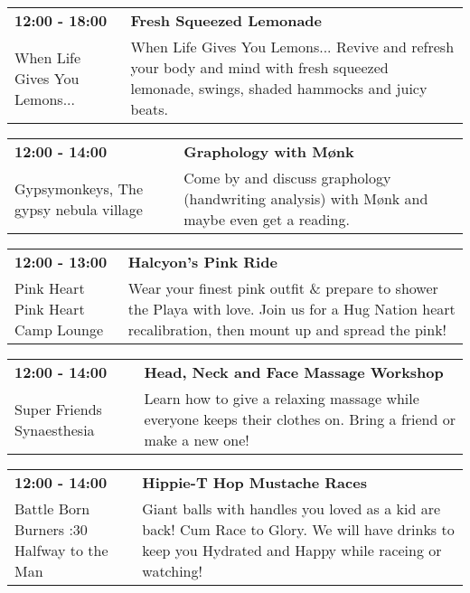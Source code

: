 \begin{tabular}{ p{1in} p{2.2in} }
    \textbf{12:00 - 18:00} & \textbf{Fresh Squeezed Lemonade} \\
    When Life Gives You Lemons... \newline  & When Life Gives You Lemons... Revive and refresh your body and mind with fresh squeezed lemonade, swings, shaded hammocks and juicy beats. \\
    \hline 
\end{tabular}
    
\begin{tabular}{ p{1in} p{2.2in} }
    \textbf{12:00 - 14:00} & \textbf{Graphology with M\o nk} \\
    Gypsymonkeys, The \newline gypsy nebula village & Come by and discuss graphology (handwriting analysis) with M\o nk and maybe even get a reading. \\
    \hline 
\end{tabular}
    
\begin{tabular}{ p{1in} p{2.2in} }
    \textbf{12:00 - 13:00} & \textbf{Halcyon's Pink Ride} \\
    Pink Heart \newline Pink Heart Camp Lounge & Wear your finest pink outfit \& prepare to shower the Playa with love. Join us for a Hug Nation heart recalibration, then mount up and spread the pink! \\
    \hline 
\end{tabular}
    
\begin{tabular}{ p{1in} p{2.2in} }
    \textbf{12:00 - 14:00} & \textbf{Head, Neck and Face Massage Workshop} \\
    Super Friends Synaesthesia \newline  & Learn how to give a relaxing massage while everyone keeps their clothes on. Bring a friend or make a new one! \\
    \hline 
\end{tabular}
    
\begin{tabular}{ p{1in} p{2.2in} }
    \textbf{12:00 - 14:00} & \textbf{Hippie-T Hop Mustache Races} \\
    Battle Born Burners \newline 6:30 Halfway to the Man & Giant balls with handles you loved as a kid are back! Cum Race to Glory. We will have drinks to keep you Hydrated and Happy while raceing or watching! \\
    \hline 
\end{tabular}
    
